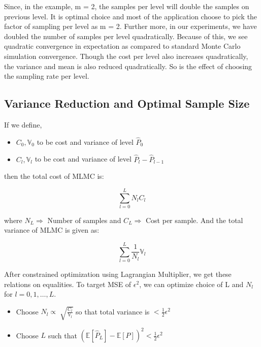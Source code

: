 \documentclass[12pt]{article}
\newcommand{\E}{\mathbb{E}}
\newcommand{\V}{\mathbb{V}}
\begin{document}
Since, in the example, m = 2, the samples per level will double the samples on previous level. It is optimal choice and most of the application choose to pick the factor of sampling per level as m = 2. Further more, in our experiments, we have doubled the number of samples per level quadratically. Because of this, we see quadratic convergence in expectation as compared to standard Monte Carlo simulation convergence. Though the cost per level also increases quadratically, the variance and mean is also reduced quadratically. So is the effect of choosing the sampling rate per level.

\clearpage

\subsection{Variance Reduction and Optimal Sample Size}

If we define,
\begin{itemize}
\item $C_0,\V_0$ to be cost and variance of level $\hat{P}_0$
\item $C_l,\V_l$ to be cost and variance of level $\hat{P}_l -\hat{P}_{l-1}$
\end{itemize}

then the total cost of MLMC is:

\begin{equation} \sum_{l=0}^{L} N_lC_l \end{equation}

where $N_L \Rightarrow$ Number of samples and $C_L  \Rightarrow$ Cost per sample.\linebreak
And the total variance of MLMC is given as:

\begin{equation} \sum_{l=0}^{L} \frac{1}{N_l}\V_l \end{equation}

After constrained optimization using Lagrangian Multiplier, we get these relations on equalities. To target MSE of $\epsilon^2$, we can optimize choice of L and $N_l$ for $l = 0, 1, \ldots, L$.

\begin{itemize}
\item Choose $N_l \propto \sqrt[]{\frac{C_l}{\V_l}}$ so that total variance is $ < \frac{1}{2}\epsilon^2$
\item Choose $L$ such that $ ( \E[\hat{P}_L] - \E[P] )^2 < \frac{1}{2}\epsilon^2$
\end{itemize}
\end{document}
